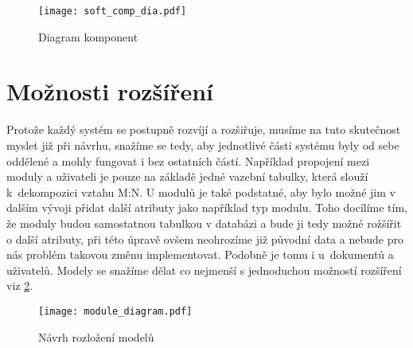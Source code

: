 \begin{figure}[H]
    \centering
    \texttt{[image: soft\_comp\_dia.pdf]}
    \caption{Diagram komponent}
    \label{fig:softCompDia}
\end{figure}

\section{Možnosti rozšíření}

Protože každý systém se postupně rozvíjí a rozšiřuje, musíme na tuto skuteč\-nost myslet již při návrhu, snažíme se tedy, aby jednotlivé části systému byly od sebe
oddělené a mohly fungovat i bez ostatních částí. Například propojení mezi moduly a uživateli je pouze na základě jedné vazební tabulky, která slouží k~dekompozici vztahu
M:N. U modulů je také podstatné, aby bylo možné jim v dalším vývoji přidat další atributy jako například typ modulu. Toho docílíme tím, že moduly budou samostatnou tabulkou v databázi
a bude ji tedy možné rožšířit o další atributy, při této úpravě ovšem neohrozíme již původní data a nebude pro nás problém takovou změnu implementovat. Podobně je tomu i u~dokumentů a uživatelů.
Modely se snažíme dělat co nejmenší s jednoduchou možností rozšíření viz \ref{fig:moduleDia}.

\begin{figure}[h]
    \centering
    \texttt{[image: module\_diagram.pdf]}
    \caption{Návrh rozložení modelů}
    \label{fig:moduleDia}
\end{figure}